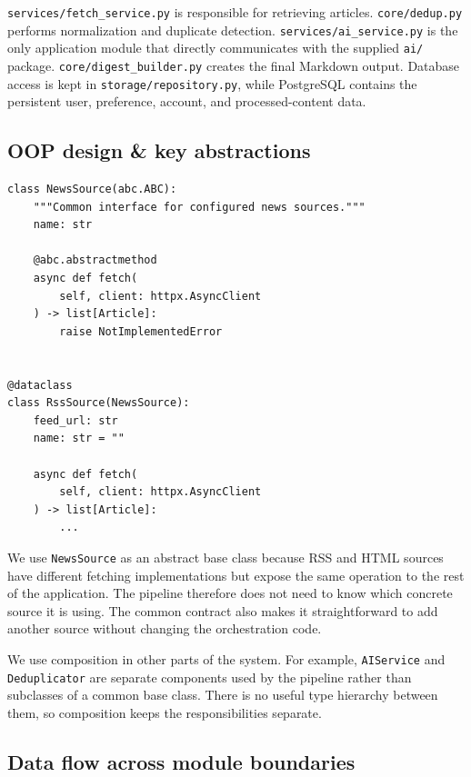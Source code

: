 \documentclass[11pt,a4paper]{article}
\begin{document}
\texttt{services/fetch\_service.py} is responsible for retrieving articles. \texttt{core/dedup.py} performs normalization and duplicate detection. \texttt{services/ai\_service.py} is the only application module that directly communicates with the supplied \texttt{ai/} package. \texttt{core/digest\_builder.py} creates the final Markdown output. Database access is kept in \texttt{storage/repository.py}, while PostgreSQL contains the persistent user, preference, account, and processed-content data.

\subsection{OOP design \& key abstractions}


\begin{lstlisting}[style=python]
class NewsSource(abc.ABC):
    """Common interface for configured news sources."""
    name: str

    @abc.abstractmethod
    async def fetch(
        self, client: httpx.AsyncClient
    ) -> list[Article]:
        raise NotImplementedError


@dataclass
class RssSource(NewsSource):
    feed_url: str
    name: str = ""

    async def fetch(
        self, client: httpx.AsyncClient
    ) -> list[Article]:
        ...
\end{lstlisting}

We use \texttt{NewsSource} as an abstract base class because RSS and HTML sources have different fetching implementations but expose the same operation to the rest of the application. The pipeline therefore does not need to know which concrete source it is using. The common contract also makes it straightforward to add another source without changing the orchestration code.

We use composition in other parts of the system. For example, \texttt{AIService} and \texttt{Deduplicator} are separate components used by the pipeline rather than subclasses of a common base class. There is no useful type hierarchy between them, so composition keeps the responsibilities separate.

\subsection{Data flow across module boundaries}
\end{document}
